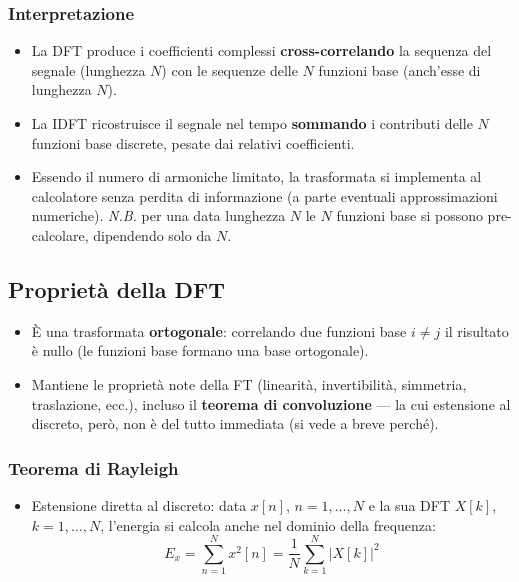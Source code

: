 \documentclass[12pt, a4paper]{article}
\begin{document}
\subsubsection{Interpretazione}
\begin{itemize}
    \item La DFT produce i coefficienti complessi \textbf{cross-correlando} la sequenza del segnale (lunghezza $N$) con le sequenze delle $N$ funzioni base (anch'esse di lunghezza $N$).
    \item La IDFT ricostruisce il segnale nel tempo \textbf{sommando} i contributi delle $N$ funzioni base discrete, pesate dai relativi coefficienti.
    \item Essendo il numero di armoniche limitato, la trasformata si implementa al calcolatore senza perdita di informazione (a parte eventuali approssimazioni numeriche). \textit{N.B.} per una data lunghezza $N$ le $N$ funzioni base si possono pre-calcolare, dipendendo solo da $N$.
\end{itemize}

\subsection{Proprietà della DFT}
\begin{itemize}
    \item È una trasformata \textbf{ortogonale}: correlando due funzioni base $i\ne j$ il risultato è nullo (le funzioni base formano una base ortogonale).
    \item Mantiene le proprietà note della FT (linearità, invertibilità, simmetria, traslazione, ecc.), incluso il \textbf{teorema di convoluzione} — la cui estensione al discreto, però, non è del tutto immediata (si vede a breve perché).
\end{itemize}

\subsubsection{Teorema di Rayleigh}
\begin{itemize}
    \item Estensione diretta al discreto: data $x[n]$, $n=1,\dots,N$ e la sua DFT $X[k]$, $k=1,\dots,N$, l'energia si calcola anche nel dominio della frequenza:
    $$E_x = \sum_{n=1}^{N} x^2[n] = \frac1N\sum_{k=1}^{N} |X[k]|^2$$
\end{itemize}
\end{document}
